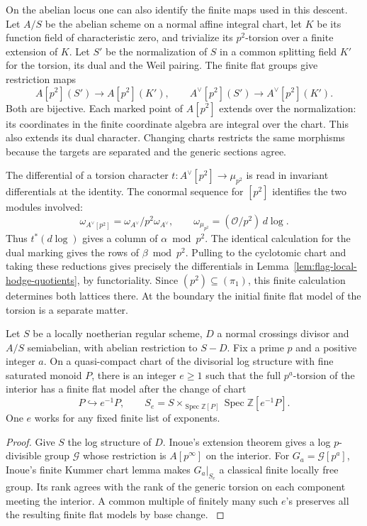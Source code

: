 On the abelian locus one can also identify the finite maps used in this descent. Let \(A/S\) be the abelian scheme on a normal affine integral chart, let \(K\) be its function field of characteristic zero, and trivialize its \(p^2\)-torsion over a finite extension of \(K\). Let \(S'\) be the normalization of \(S\) in a common splitting field \(K'\) for the torsion, its dual and the Weil pairing. The finite flat groups give restriction maps
\[
 A[p^2](S')\longrightarrow A[p^2](K'),\qquad
 A^\vee[p^2](S')\longrightarrow A^\vee[p^2](K').
\]
Both are bijective. Each marked point of \(A[p^2]\) extends over the normalization: its coordinates in the finite coordinate algebra are integral over the chart. This also extends its dual character. Changing charts restricts the same morphisms because the targets are separated and the generic sections agree.

The differential of a torsion character \(t:A^\vee[p^2]\to\mu_{p^2}\) is read in invariant differentials at the identity. The conormal sequence for \([p^2]\) identifies the two modules involved:
\[
 \omega_{A^\vee[p^2]}=\omega_{A^\vee}/p^2\omega_{A^\vee},
 \qquad \omega_{\mu_{p^2}}=(\mathcal O/p^2)\,d\log .
\]
Thus \(t^*(d\log)\) gives a column of \(\alpha\bmod p^2\). The identical calculation for the dual marking gives the rows of \(\beta\bmod p^2\). Pulling to the cyclotomic chart and taking these reductions gives precisely the differentials in Lemma~\ref{lem:flag-local-hodge-quotients}, by functoriality. Since \((p^2)\subseteq(\pi_1)\), this finite calculation determines both lattices there. At the boundary the initial finite flat model of the torsion is a separate matter.

\begin{auxlemma}\label{lem:flag-kummer-boundary}
Let \(S\) be a locally noetherian regular scheme, \(D\) a normal crossings divisor and \(A/S\) semiabelian, with abelian restriction to \(S-D\). Fix a prime \(p\) and a positive integer \(a\). On a quasi-compact chart of the divisorial log structure with fine saturated monoid \(P\), there is an integer \(e\ge1\) such that the full \(p^a\)-torsion of the interior has a finite flat model after the change of chart
\[
     P\hookrightarrow e^{-1}P,\qquad
     S_e=S\times_{\operatorname{Spec}\mathbb Z[P]}
                    \operatorname{Spec}\mathbb Z[e^{-1}P].
\]
One \(e\) works for any fixed finite list of exponents.
\end{auxlemma}
\begin{proof}
Give \(S\) the log structure of \(D\). Inoue's extension theorem gives a log \(p\)-divisible group \(\mathcal G\) whose restriction is \(A[p^\infty]\) on the interior. For \(G_a=\mathcal G[p^a]\), Inoue's finite Kummer chart lemma makes \(G_a|_{S_e}\) a classical finite locally free group. Its rank agrees with the rank of the generic torsion on each component meeting the interior. A common multiple of finitely many such \(e\)'s preserves all the resulting finite flat models by base change. \cite{inoue-log-flag}
\end{proof}


